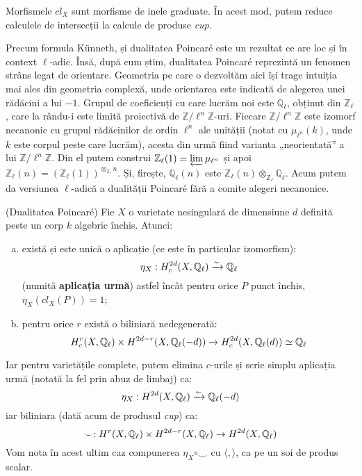 \documentclass[13pt,openany,oneside]{book}
\begin{document}
Morfismele $cl_X$ sunt morfisme de inele graduate. În acest mod, putem reduce calculele de intersecții la calcule de produse {\it cup}.

Precum formula Künneth, și dualitatea Poincaré este un rezultat ce are loc și în context $\ell$-adic. Însă, după cum știm, dualitatea Poincaré reprezintă un fenomen strâns legat de orientare. Geometria pe care o dezvoltăm aici își trage intuiția mai ales din geometria complexă, unde orientarea este indicată de alegerea unei rădăcini a lui $-1$. Grupul de coeficienți cu care lucrăm noi este $\mathbb{Q}_\ell$, obținut din $\mathbb{Z}_\ell$, care la rându-i este limită proiectivă de $\mathbb{Z}/\ell^n\mathbb{Z}$-uri. Fiecare $\mathbb{Z}/\ell^n\mathbb{Z}$ este izomorf necanonic cu grupul rădăcinilor de ordin $\ell^n$ ale unității (notat cu $\mu_{\ell^n}(k)$, unde $k$ este corpul peste care lucrăm), acesta din urmă fiind varianta „neorientată” a lui $\mathbb{Z}/\ell^n\mathbb{Z}$. Din el putem construi $\mathbb{Z}_\ell(1)=\varprojlim \mu_{\ell^n}$ și apoi $\mathbb{Z}_\ell(n)=(\mathbb{Z}_\ell(1))^{\otimes_{\mathbb{Z}_\ell}n}$. Și, firește, $\mathbb{Q}_\ell(n)$ este $\mathbb{Z}_\ell(n) \otimes_{\mathbb{Z}_\ell} \mathbb{Q}_\ell$. Acum putem da versiunea $\ell$-adică a dualității Poincaré fără a comite alegeri necanonice.

\begin{teo}
(Dualitatea Poincaré) Fie $X$ o varietate nesingulară de dimensiune $d$ definită peste un corp $k$ algebric închis. Atunci:
\begin{enumerate}[a)]
\item există și este unică o aplicație (ce este în particular izomorfism):
$$\eta_X : H^{2d}_c(X,\mathbb{Q}_\ell) \xrightarrow{\sim} \mathbb{Q}_\ell$$
(numită {\bf aplicația urmă}) astfel încât pentru orice $P$ punct închis, $\eta_X(cl_X(P))=1$;
\item pentru orice $r$ există o biliniară nedegenerată:
$$H^r_c(X,\mathbb{Q}_\ell) \times H^{2d-r}(X,\mathbb{Q}_\ell(-d)) \rightarrow H^{2d}_c(X,\mathbb{Q}_\ell(d)) \simeq \mathbb{Q}_\ell$$
\end{enumerate}
Iar pentru varietățile complete, putem elimina $c$-urile și scrie simplu aplicația urmă (notată la fel prin abuz de limbaj) ca:
$$\eta_X: H^{2d}(X,\mathbb{Q}_\ell) \xrightarrow{\sim} \mathbb{Q}_\ell(-d)$$
iar biliniara (dată acum de produsul {\it cup}) ca:
$$\smile:H^r(X,\mathbb{Q}_\ell) \times H^{2d-r}(X,\mathbb{Q}_\ell) \rightarrow H^{2d}(X,\mathbb{Q}_\ell)$$
Vom nota în acest ultim caz compunerea $\eta_X \circ \smile$ cu $\langle,\rangle$, ca pe un soi de produs scalar.
\end{teo}
\end{document}
